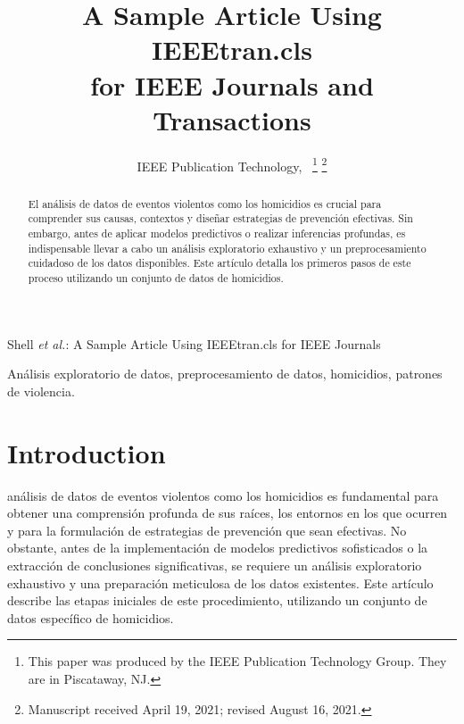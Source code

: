 \documentclass[lettersize,journal]{IEEEtran}
\begin{document}
\title{A Sample Article Using IEEEtran.cls\\ for IEEE Journals and Transactions}

\author{IEEE Publication Technology,~
\thanks{This paper was produced by the IEEE Publication Technology Group. They are in Piscataway, NJ.}%
\thanks{Manuscript received April 19, 2021; revised August 16, 2021.}}

%
{Shell \MakeLowercase{\textit{et al.}}: A Sample Article Using IEEEtran.cls for IEEE Journals}


\maketitle

\begin{abstract}
El análisis de datos de eventos violentos como los homicidios es crucial para comprender sus causas, contextos y diseñar estrategias de prevención efectivas. Sin embargo, antes de aplicar modelos predictivos o realizar inferencias profundas, es indispensable llevar a cabo un análisis exploratorio exhaustivo y un preprocesamiento cuidadoso de los datos disponibles. Este artículo detalla los primeros pasos de este proceso utilizando un conjunto de datos de homicidios.
\end{abstract}

\begin{IEEEkeywords}
Análisis exploratorio de datos, preprocesamiento de datos, homicidios, patrones de violencia.
\end{IEEEkeywords}

\section{Introduction}
 análisis de datos de eventos violentos como los homicidios es fundamental para obtener una comprensión
 profunda de sus raíces, los entornos en los que ocurren y para la formulación de estrategias de prevención que sean efectivas. 
 No obstante, antes de la implementación de modelos predictivos sofisticados o la extracción de conclusiones significativas, 
 se requiere un análisis exploratorio exhaustivo y una preparación meticulosa de los datos existentes. Este artículo describe
  las etapas iniciales de este procedimiento, utilizando un conjunto de datos específico de homicidios.
\end{document}
